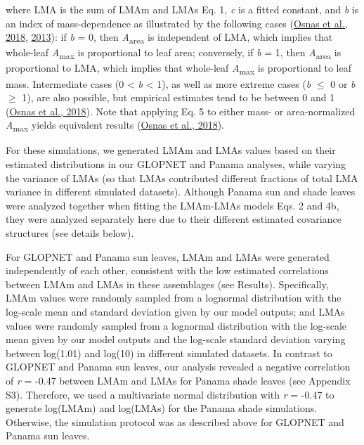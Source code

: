 \documentclass[
  12pt,
  letterpaper,
  DIV=11,
  numbers=noendperiod]{scrartcl}
\begin{document}
where LMA is the sum of LMAm and LMAs Eq. 1, \emph{c} is a fitted
constant, and \emph{b} is an index of mass-dependence as illustrated by
the following cases (\protect\hyperlink{ref-Osnas2018}{Osnas et al.,
2018}, \protect\hyperlink{ref-Osnas2013}{2013}): if \emph{b} = 0, then
\emph{A}\textsubscript{area} is independent of LMA, which implies that
whole-leaf \emph{A}\textsubscript{max} is proportional to leaf area;
conversely, if \emph{b} = 1, then \emph{A}\textsubscript{area} is
proportional to LMA, which implies that whole-leaf
\emph{A}\textsubscript{max} is proportional to leaf mass. Intermediate
cases (0 \textless{} \emph{b} \textless{} 1), as well as more extreme
cases (\emph{b} \(\le\) 0 or \emph{b} \(\geq\) 1), are also possible,
but empirical estimates tend to be between 0 and 1
(\protect\hyperlink{ref-Osnas2018}{Osnas et al., 2018}). Note that
applying Eq. 5 to either mass- or area-normalized
\emph{A}\textsubscript{max} yields equivalent results
(\protect\hyperlink{ref-Osnas2018}{Osnas et al., 2018}).

For these simulations, we generated LMAm and LMAs values based on their
estimated distributions in our GLOPNET and Panama analyses, while
varying the variance of LMAs (so that LMAs contributed different
fractions of total LMA variance in different simulated datasets).
Although Panama sun and shade leaves were analyzed together when fitting
the LMAm-LMAs models Eqs. 2 and 4b, they were analyzed separately here
due to their different estimated covariance structures (see details
below).

For GLOPNET and Panama sun leaves, LMAm and LMAs were generated
independently of each other, consistent with the low estimated
correlations between LMAm and LMAs in these assemblages (see Results).
Specifically, LMAm values were randomly sampled from a lognormal
distribution with the log-scale mean and standard deviation given by our
model outputs; and LMAs values were randomly sampled from a lognormal
distribution with the log-scale mean given by our model outputs and the
log-scale standard deviation varying between log(1.01) and log(10) in
different simulated datasets. In contrast to GLOPNET and Panama sun
leaves, our analysis revealed a negative correlation of \emph{r} = -0.47
between LMAm and LMAs for Panama shade leaves (see Appendix S3).
Therefore, we used a multivariate normal distribution with \emph{r} =
-0.47 to generate log(LMAm) and log(LMAs) for the Panama shade
simulations. Otherwise, the simulation protocol was as described above
for GLOPNET and Panama sun leaves.
\end{document}
